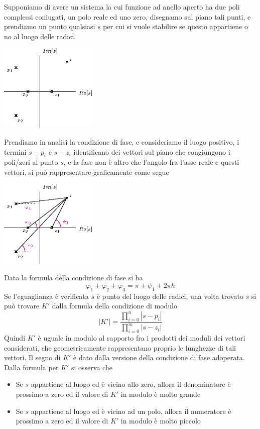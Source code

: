 \documentclass[10pt, letterpaper]{report}
\begin{document}
Supponiamo di avere un sistema la cui funzione ad anello aperto ha due poli complessi coniugati, un polo reale ed uno zero, disegnamo sul piano tali punti, e prendiamo un punto qualsiasi $s$ per cui si vuole stabilire se questo appartiene o no al luogo delle radici.
\begin{center}
    \includegraphics[width=0.35\textwidth ]{images/faseLuogo.eps}
\end{center}
Prendiamo in analisi la condizione di fase, e consideriamo il luogo positivo, i termini $s-p_i$ e $s-z_i$ identificano dei vettori sul piano che congiungono i poli/zeri al punto $s$, e la fase non è altro che l'angolo fra l'asse reale e questi vettori, si può rappresentare graficamente come segue
\begin{center}
    \includegraphics[width=0.35\textwidth ]{images/faseLuogo2.eps}
\end{center}
Data la formula della condizione di fase si ha 
$$ \varphi_1+\varphi_2+\varphi_3=\pi+\psi_1+2\pi h$$
Se l'eguaglianza è verificata $s$ è punto del luogo delle radici, una volta trovato $s$ si può trovare $K'$ dalla formula della condizione di modulo 
$$ |K'|=\frac{ \displaystyle\prod_{i=0}^n|s-p_i|}{\displaystyle\prod_{i=0}^m|s-z_i|}$$
Quindi $K'$ è uguale in modulo al rapporto fra i prodotti dei moduli dei vettori considerati, che geometricamente rappresentano proprio le lunghezze di tali vettori. Il segno di $K'$ è dato dalla versione della condizione di fase adoperata. Dalla formula per $K'$ si osserva che \begin{itemize}
    \item Se $s$ appartiene al luogo ed è vicino allo zero, allora il denominatore è prossimo a zero ed il valore di $K'$ in modulo è molto grande 
    \item  Se $s$ appartiene al luogo ed è vicino ad un polo, allora il numeratore è prossimo a zero ed il valore di $K'$ in modulo è molto piccolo 
\end{itemize}
\end{document}
